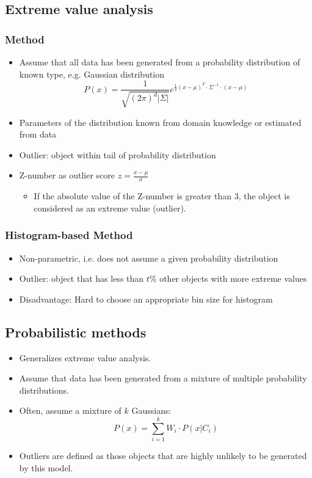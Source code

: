 \documentclass[../notes.tex]{subfiles}
\begin{document}
\subsection{Extreme value analysis}
\subsubsection{Method}
\begin{itemize}
  \item Assume that all data has been generated from a probability distribution of known type, e.g. Gaussian distribution
  $$P(x) = \frac{1}{\sqrt{(2 \pi)^d |\Sigma|}} e^{\frac{1}{2}(x-\mu)^T \cdot \Sigma^{-1} \cdot (x-\mu)}$$
  \item Parameters of the distribution known from domain knowledge or estimated from data
  \item Outlier: object within tail of probability distribution
  \item Z-number as outlier score $z = \frac{x - \mu}{\sigma}$ 
  \begin{itemize}
    \item If the absolute value of the Z-number is greater than 3, the object is considered as an extreme value (outlier).
  \end{itemize}   
\end{itemize}

\subsubsection{Histogram-based Method}
\begin{itemize}
  \item Non-parametric, i.e. does not assume a given probability distribution
  \item Outlier: object that has less than $t\%$ other objects with more extreme values
  \item Disadvantage: Hard to choose an appropriate bin size for histogram
\end{itemize}

\newpage

\subsection{Probabilistic methods}
\begin{itemize}
  \item Generalizes extreme value analysis.
  \item Assume that data has been generated from a mixture of multiple probability distributions.
  \item Often, assume a mixture of $k$ Gaussians:
  $$P(x) = \sum_{i=1}^k W_i \cdot P(x|C_i)$$
  \item Outliers are defined as those objects that are highly unlikely to be generated by this model.
\end{itemize}
\end{document}

